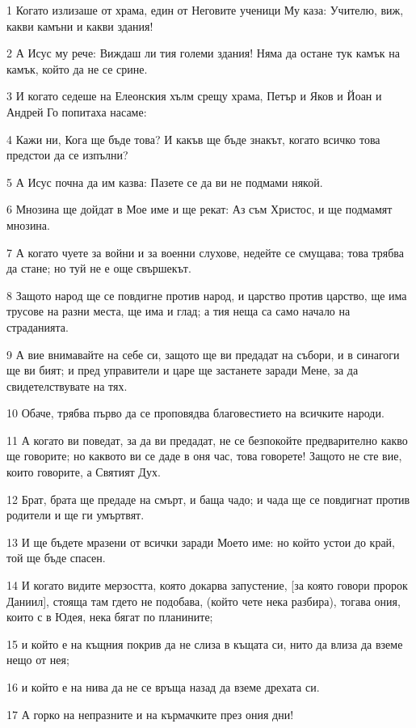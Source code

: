\par 1 Когато излизаше от храма, един от Неговите ученици Му каза: Учителю, виж, какви камъни и какви здания!
\par 2 А Исус му рече: Виждаш ли тия големи здания! Няма да остане тук камък на камък, който да не се срине.
\par 3 И когато седеше на Елеонския хълм срещу храма, Петър и Яков и Йоан и Андрей Го попитаха насаме:
\par 4 Кажи ни, Кога ще бъде това? И какъв ще бъде знакът, когато всичко това предстои да се изпълни?
\par 5 А Исус почна да им казва: Пазете се да ви не подмами някой.
\par 6 Мнозина ще дойдат в Мое име и ще рекат: Аз съм Христос, и ще подмамят мнозина.
\par 7 А когато чуете за войни и за военни слухове, недейте се смущава; това трябва да стане; но туй не е още свършекът.
\par 8 Защото народ ще се повдигне против народ, и царство против царство, ще има трусове на разни места, ще има и глад; а тия неща са само начало на страданията.
\par 9 А вие внимавайте на себе си, защото ще ви предадат на събори, и в синагоги ще ви бият; и пред управители и царе ще застанете заради Мене, за да свидетелствувате на тях.
\par 10 Обаче, трябва първо да се проповядва благовестието на всичките народи.
\par 11 А когато ви поведат, за да ви предадат, не се безпокойте предварително какво ще говорите; но каквото ви се даде в оня час, това говорете! Защото не сте вие, които говорите, а Святият Дух.
\par 12 Брат, брата ще предаде на смърт, и баща чадо; и чада ще се повдигнат против родители и ще ги умъртвят.
\par 13 И ще бъдете мразени от всички заради Моето име: но който устои до край, той ще бъде спасен.
\par 14 И когато видите мерзостта, която докарва запустение, [за която говори пророк Даниил], стояща там гдето не подобава, (който чете нека разбира), тогава ония, които с в Юдея, нека бягат по планините;
\par 15 и който е на къщния покрив да не слиза в къщата си, нито да влиза да вземе нещо от нея;
\par 16 и който е на нива да не се връща назад да вземе дрехата си.
\par 17 А горко на непразните и на кърмачките през ония дни!
